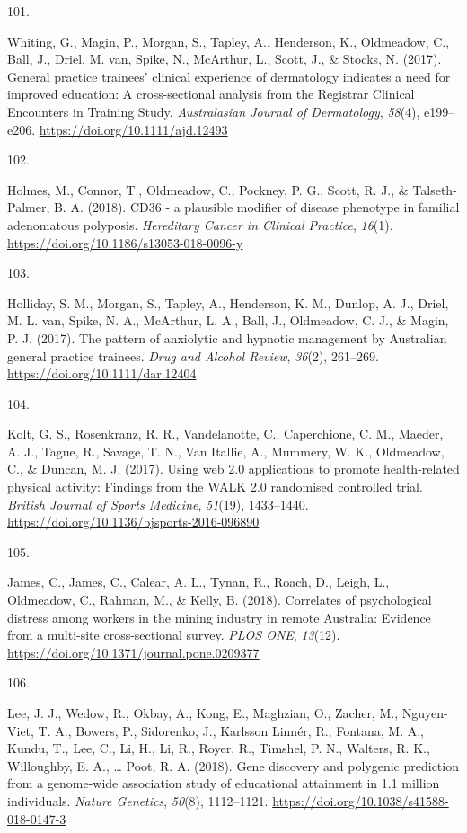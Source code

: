 \documentclass[11pt, a4paper]{awesome-cv}
\newlength{\csllabelwidth}
\newcommand{\CSLLeftMargin}[1]{\parbox[t]{\csllabelwidth}{#1}}
\newcommand{\CSLRightInline}[1]{\parbox[t]{\linewidth - \csllabelwidth}{#1}}
\begin{document}
\leavevmode\hypertarget{ref-whiting_general_2017}{}%
\CSLLeftMargin{101. }
\CSLRightInline{Whiting, G., Magin, P., Morgan, S., Tapley, A.,
Henderson, K., Oldmeadow, C., Ball, J., Driel, M. van, Spike, N.,
McArthur, L., Scott, J., \& Stocks, N. (2017). General practice
trainees' clinical experience of dermatology indicates a need for
improved education: A cross-sectional analysis from the Registrar
Clinical Encounters in Training Study. \emph{Australasian Journal of
Dermatology}, \emph{58}(4), e199--e206.
\url{https://doi.org/10.1111/ajd.12493}}

\leavevmode\hypertarget{ref-holmes_cd36_2018}{}%
\CSLLeftMargin{102. }
\CSLRightInline{Holmes, M., Connor, T., Oldmeadow, C., Pockney, P. G.,
Scott, R. J., \& Talseth-Palmer, B. A. (2018). CD36 - a plausible
modifier of disease phenotype in familial adenomatous polyposis.
\emph{Hereditary Cancer in Clinical Practice}, \emph{16}(1).
\url{https://doi.org/10.1186/s13053-018-0096-y}}

\leavevmode\hypertarget{ref-holliday_pattern_2017}{}%
\CSLLeftMargin{103. }
\CSLRightInline{Holliday, S. M., Morgan, S., Tapley, A., Henderson, K.
M., Dunlop, A. J., Driel, M. L. van, Spike, N. A., McArthur, L. A.,
Ball, J., Oldmeadow, C. J., \& Magin, P. J. (2017). The pattern of
anxiolytic and hypnotic management by Australian general practice
trainees. \emph{Drug and Alcohol Review}, \emph{36}(2), 261--269.
\url{https://doi.org/10.1111/dar.12404}}

\leavevmode\hypertarget{ref-kolt_using_2017}{}%
\CSLLeftMargin{104. }
\CSLRightInline{Kolt, G. S., Rosenkranz, R. R., Vandelanotte, C.,
Caperchione, C. M., Maeder, A. J., Tague, R., Savage, T. N., Van
Itallie, A., Mummery, W. K., Oldmeadow, C., \& Duncan, M. J. (2017).
Using web 2.0 applications to promote health-related physical activity:
Findings from the WALK 2.0 randomised controlled trial. \emph{British
Journal of Sports Medicine}, \emph{51}(19), 1433--1440.
\url{https://doi.org/10.1136/bjsports-2016-096890}}

\leavevmode\hypertarget{ref-james_correlates_2018}{}%
\CSLLeftMargin{105. }
\CSLRightInline{James, C., James, C., Calear, A. L., Tynan, R., Roach,
D., Leigh, L., Oldmeadow, C., Rahman, M., \& Kelly, B. (2018).
Correlates of psychological distress among workers in the mining
industry in remote Australia: Evidence from a multi-site cross-sectional
survey. \emph{PLOS ONE}, \emph{13}(12).
\url{https://doi.org/10.1371/journal.pone.0209377}}

\leavevmode\hypertarget{ref-lee_gene_2018}{}%
\CSLLeftMargin{106. }
\CSLRightInline{Lee, J. J., Wedow, R., Okbay, A., Kong, E., Maghzian,
O., Zacher, M., Nguyen-Viet, T. A., Bowers, P., Sidorenko, J., Karlsson
Linnér, R., Fontana, M. A., Kundu, T., Lee, C., Li, H., Li, R., Royer,
R., Timshel, P. N., Walters, R. K., Willoughby, E. A., \ldots{} Poot, R.
A. (2018). Gene discovery and polygenic prediction from a genome-wide
association study of educational attainment in 1.1 million individuals.
\emph{Nature Genetics}, \emph{50}(8), 1112--1121.
\url{https://doi.org/10.1038/s41588-018-0147-3}}
\end{document}
